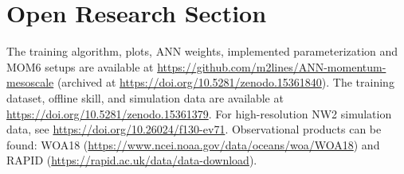 \documentclass[draft]{agujournal2019}
\begin{document}
\section*{Open Research Section}
The training algorithm, plots, ANN weights, implemented parameterization and MOM6 setups are available at \url{https://github.com/m2lines/ANN-momentum-mesoscale} (archived at \url{https://doi.org/10.5281/zenodo.15361840}). The training dataset, offline skill, and simulation data are available at \url{https://doi.org/10.5281/zenodo.15361379}. For high-resolution NW2 simulation data, see \url{https://doi.org/10.26024/f130-ev71}. Observational products can be found: WOA18 (\url{https://www.ncei.noaa.gov/data/oceans/woa/WOA18}) and RAPID (\url{https://rapid.ac.uk/data/data-download}).

\end{document}
